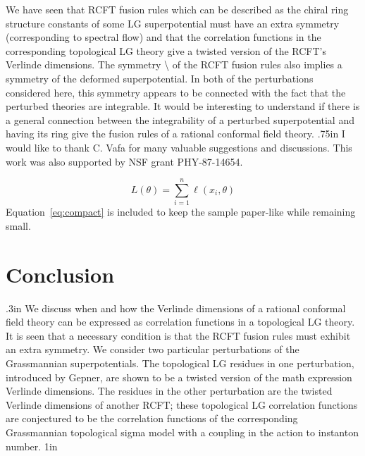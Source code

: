 \documentclass[11pt]{article}
\begin{document}
We have seen that RCFT fusion rules which can be described as the chiral ring structure constants of some LG superpotential must have an extra symmetry (corresponding to spectral flow) and that the correlation functions in the corresponding topological LG theory give a twisted version of the RCFT's Verlinde dimensions. The symmetry \textbackslash{} of the RCFT fusion rules also implies a symmetry of the deformed superpotential. In both of the perturbations considered here, this symmetry appears to be connected with the fact that the perturbed theories are integrable. It would be interesting to understand if there is a general connection between the integrability of a perturbed superpotential and having its ring give the fusion rules of a rational conformal field theory. .75in I would like to thank C. Vafa for many valuable suggestions and discussions. This work was also supported by NSF grant PHY-87-14654.

\begin{equation}
\label{eq:compact}
L(\theta) = \sum_{i=1}^{n} \ell(x_i, \theta)
\end{equation}
Equation~\ref{eq:compact} is included to keep the sample paper-like while remaining small.

\section{Conclusion}

.3in We discuss when and how the Verlinde dimensions of a rational conformal field theory can be expressed as correlation functions in a topological LG theory. It is seen that a necessary condition is that the RCFT fusion rules must exhibit an extra symmetry. We consider two particular perturbations of the Grassmannian superpotentials. The topological LG residues in one perturbation, introduced by Gepner, are shown to be a twisted version of the math expression Verlinde dimensions. The residues in the other perturbation are the twisted Verlinde dimensions of another RCFT; these topological LG correlation functions are conjectured to be the correlation functions of the corresponding Grassmannian topological sigma model with a coupling in the action to instanton number. 1in
\end{document}
